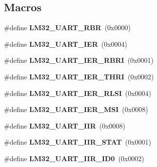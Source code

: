 \subsection*{Macros}
\begin{DoxyCompactItemize}
\item 
\mbox{\label{group__lm32__uart_gae443b9d94c3dbf22f40362c5006ff253}} 
\#define {\bfseries L\+M32\+\_\+\+U\+A\+R\+T\+\_\+\+R\+BR}~(0x0000)
\item 
\mbox{\label{group__lm32__uart_ga6acd96bac7d537c80aa60465d9eab692}} 
\#define {\bfseries L\+M32\+\_\+\+U\+A\+R\+T\+\_\+\+I\+ER}~(0x0004)
\item 
\mbox{\label{group__lm32__uart_ga08805ec623c08301ed283c3dfd33b521}} 
\#define {\bfseries L\+M32\+\_\+\+U\+A\+R\+T\+\_\+\+I\+E\+R\+\_\+\+R\+B\+RI}~(0x0001)
\item 
\mbox{\label{group__lm32__uart_ga786a8716c71cec90c98506f07b66578c}} 
\#define {\bfseries L\+M32\+\_\+\+U\+A\+R\+T\+\_\+\+I\+E\+R\+\_\+\+T\+H\+RI}~(0x0002)
\item 
\mbox{\label{group__lm32__uart_ga76a0540050fe8066c8c95012745f046a}} 
\#define {\bfseries L\+M32\+\_\+\+U\+A\+R\+T\+\_\+\+I\+E\+R\+\_\+\+R\+L\+SI}~(0x0004)
\item 
\mbox{\label{group__lm32__uart_ga53e41e611fce91dae2afa2438529dc17}} 
\#define {\bfseries L\+M32\+\_\+\+U\+A\+R\+T\+\_\+\+I\+E\+R\+\_\+\+M\+SI}~(0x0008)
\item 
\mbox{\label{group__lm32__uart_ga0d4e35cefbed8cd14b9be4160fd87c33}} 
\#define {\bfseries L\+M32\+\_\+\+U\+A\+R\+T\+\_\+\+I\+IR}~(0x0008)
\item 
\mbox{\label{group__lm32__uart_gac15f0091c49168c5af87f2f682eebb95}} 
\#define {\bfseries L\+M32\+\_\+\+U\+A\+R\+T\+\_\+\+I\+I\+R\+\_\+\+S\+T\+AT}~(0x0001)
\item 
\mbox{\label{group__lm32__uart_gac222708c8bb1b73fb971000f6c66a9d8}} 
\#define {\bfseries L\+M32\+\_\+\+U\+A\+R\+T\+\_\+\+I\+I\+R\+\_\+\+I\+D0}~(0x0002)

\end{DoxyCompactItemize}
